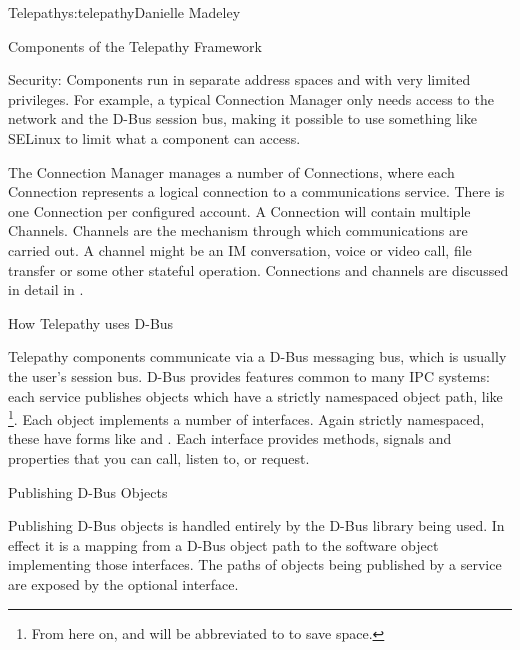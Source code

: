 \begin{aosachapter}{Telepathy}{s:telepathy}{Danielle Madeley}
\begin{aosasect1}{Components of the Telepathy Framework}
\begin{aosadescription}
  \item{Security:} Components run in separate address spaces and
  with very limited privileges.  For example, a typical
  Connection Manager only needs access to the network and the D-Bus
  session bus, making it possible to use something like SELinux to
  limit what a component can access.

\end{aosadescription}

The Connection Manager manages a number of Connections, where each
Connection represents a logical connection to a communications
service. There is one Connection per configured account.
A Connection will contain multiple Channels. Channels are the
mechanism through which communications are carried out. A channel
might be an IM conversation, voice or video call, file transfer or
some other stateful operation.  Connections and channels are discussed
in detail in .

\end{aosasect1}

\begin{aosasect1}{How Telepathy uses D-Bus}

Telepathy components communicate via a D-Bus messaging bus, which is
usually the user's session bus.  D-Bus provides features common to
many IPC systems: each service publishes objects which have
a strictly namespaced object path, like
\footnote{From here
on,  and
 will be abbreviated to 
to save space.}.  Each object implements a number of
interfaces. Again strictly namespaced, these have forms like
 and .
Each interface provides methods, signals and properties that you can
call, listen to, or request.


\begin{aosabox}{Publishing D-Bus Objects}

Publishing D-Bus objects is handled entirely by the D-Bus library
being used. In effect it is a mapping from a D-Bus object path to the
software object implementing those interfaces.  The paths of objects
being published by a service are exposed by the optional
 interface.


\end{aosabox}
\end{aosasect1}
\end{aosachapter}
